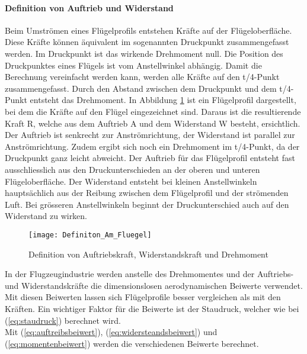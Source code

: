 \paragraph{Definition von Auftrieb und Widerstand} 
\label{para:definition_von_auftrieb_und_wiederstand}
$\;$\\ 
Beim Umströmen eines Flügelprofils entstehen Kräfte auf der Flügeloberfläche. Diese Kräfte können äquivalent im sogenannten Druckpunkt zusammengefasst werden. Im Druckpunkt ist das wirkende Drehmoment null. Die Position des Druckpunktes eines Flügels ist vom Anstellwinkel abhängig. Damit die Berechnung vereinfacht werden kann, werden alle Kräfte auf den t/4-Punkt zusammengefasst. Durch den Abstand zwischen dem Druckpunkt und dem t/4-Punkt entsteht das Drehmoment. In Abbildung \ref{fig:definition_auftrieb_widerstand_moment} ist ein Flügelprofil dargestellt, bei dem die Kräfte auf den Flügel eingezeichnet sind. Daraus ist die resultierende Kraft R, welche aus dem Auftrieb A und dem Widerstand W besteht, ersichtlich. Der Auftrieb ist senkrecht zur Anströmrichtung, der Widerstand ist parallel zur Anströmrichtung. Zudem ergibt sich noch ein Drehmoment im t/4-Punkt, da der Druckpunkt ganz leicht abweicht. Der Auftrieb für das Flügelprofil entsteht  fast ausschliesslich aus den Druckunterschieden an der oberen und unteren Flügeloberfläche. Der Widerstand entsteht bei kleinen Anstellwinkeln hauptsächlich aus der Reibung zwischen dem Flügelprofil und der strömenden Luft. Bei grösseren Anstellwinkeln beginnt der Druckunterschied auch auf den Widerstand zu wirken. 


        \begin{figure}[htb!]
        \begin{center}
        \texttt{[image: Definiton\_Am\_Fluegel]}
        \caption{Definition von Auftriebskraft, Widerstandskraft und Drehmoment \cite{ESA98}}
        \label{fig:definition_auftrieb_widerstand_moment}
        \end{center}
        \end{figure}



In der Flugzeugindustrie werden anstelle des Drehmomentes und der Auftriebs- und Widerstandskräfte die dimensionslosen aerodynamischen Beiwerte verwendet. Mit diesen Beiwerten lassen sich Flügelprofile besser vergleichen als mit den Kräften. Ein wichtiger Faktor für die Beiwerte ist der Staudruck, welcher wie bei (\ref{eq:staudruck}) berechnet wird.\\
Mit (\ref{eq:auftreibsbeiwert}), (\ref{eq:widersteandsbeiwert}) und (\ref{eq:momentenbeiwert}) werden die verschiedenen Beiwerte berechnet. 

